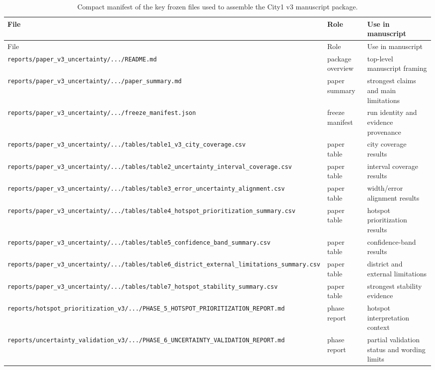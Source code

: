 \begin{longtable}{L{4.8cm}L{2.3cm}L{6.0cm}}
\caption{Compact manifest of the key frozen files used to assemble the City1 v3 manuscript package.}\label{tab:s4-file-manifest}\\
\toprule
File & Role & Use in manuscript \\
\midrule
\endfirsthead
\toprule
File & Role & Use in manuscript \\
\midrule
\endhead
\texttt{reports/paper\_v3\_uncertainty/.../README.md} & package overview & top-level manuscript framing \\
\texttt{reports/paper\_v3\_uncertainty/.../paper\_summary.md} & paper summary & strongest claims and main limitations \\
\texttt{reports/paper\_v3\_uncertainty/.../freeze\_manifest.json} & freeze manifest & run identity and evidence provenance \\
\texttt{reports/paper\_v3\_uncertainty/.../tables/table1\_v3\_city\_coverage.csv} & paper table & city coverage results \\
\texttt{reports/paper\_v3\_uncertainty/.../tables/table2\_uncertainty\_interval\_coverage.csv} & paper table & interval coverage results \\
\texttt{reports/paper\_v3\_uncertainty/.../tables/table3\_error\_uncertainty\_alignment.csv} & paper table & width/error alignment results \\
\texttt{reports/paper\_v3\_uncertainty/.../tables/table4\_hotspot\_prioritization\_summary.csv} & paper table & hotspot prioritization results \\
\texttt{reports/paper\_v3\_uncertainty/.../tables/table5\_confidence\_band\_summary.csv} & paper table & confidence-band results \\
\texttt{reports/paper\_v3\_uncertainty/.../tables/table6\_district\_external\_limitations\_summary.csv} & paper table & district and external limitations \\
\texttt{reports/paper\_v3\_uncertainty/.../tables/table7\_hotspot\_stability\_summary.csv} & paper table & strongest stability evidence \\
\texttt{reports/hotspot\_prioritization\_v3/.../PHASE\_5\_HOTSPOT\_PRIORITIZATION\_REPORT.md} & phase report & hotspot interpretation context \\
\texttt{reports/uncertainty\_validation\_v3/.../PHASE\_6\_UNCERTAINTY\_VALIDATION\_REPORT.md} & phase report & partial validation status and wording limits \\
\bottomrule
\end{longtable}

